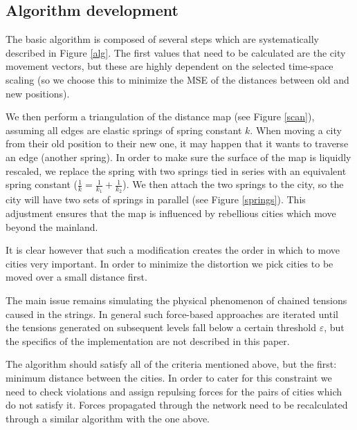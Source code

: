 \documentclass[a4paper,11pt]{article}
\begin{document}
\subsection{Algorithm development}

The basic algorithm is composed of several steps which are
systematically described in Figure \ref{alg}. The first values that
need to be calculated are the city movement vectors, but these are
highly dependent on the selected time-space scaling (so we choose this
to minimize the MSE of the distances between old and new
positions).

We then perform a triangulation of the distance map (see Figure
\ref{scan}), assuming all edges are elastic springs of spring
constant $k$. When moving a city from their old position to their new
one, it may happen that it wants to traverse an edge (another
spring). In order to make sure the surface of the map is liquidly
rescaled, we replace the spring with two springs tied in series with
an equivalent spring constant ($\frac{1}{k} = \frac{1}{k_1} +
\frac{1}{k_2}$). We then attach the two springs to the city, so the
city will have two sets of springs in parallel (see Figure
\ref{springs}). This adjustment ensures that the map is influenced by
rebellious cities which move beyond the mainland.

It is clear however that such a modification creates the order in
which to move cities very important. In order to minimize the
distortion we pick cities to be moved over a small distance first.

The main issue remains simulating the physical phenomenon of chained
tensions caused in the strings. In general such force-based approaches
are iterated until the tensions generated on subsequent levels fall
below a certain threshold $\varepsilon$, but the specifics of the
implementation are not described in this paper.

The algorithm should satisfy all of the criteria mentioned above, but
the first: minimum distance between the cities. In order to cater for
this constraint we need to check violations and assign repulsing
forces for the pairs of cities which do not satisfy it. Forces
propagated through the network need to be recalculated through a
similar algorithm with the one above.
\end{document}
